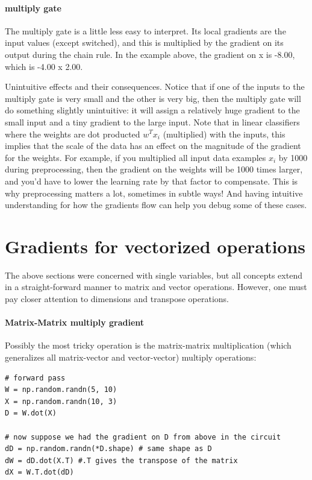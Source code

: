 \paragraph*{multiply gate} The multiply gate is a little less easy to interpret. Its local gradients are the input values (except switched), and this is multiplied by the gradient on its output during the chain rule. In the example above, the gradient on x is -8.00, which is -4.00 x 2.00.

Unintuitive effects and their consequences. Notice that if one of the inputs to the multiply gate is very small and the other is very big, then the multiply gate will do something slightly unintuitive: it will assign a relatively huge gradient to the small input and a tiny gradient to the large input. Note that in linear classifiers where the weights are dot producted $w^Tx_i$ (multiplied) with the inputs, this implies that the scale of the data has an effect on the magnitude of the gradient for the weights. For example, if you multiplied all input data examples $x_i$ by 1000 during preprocessing, then the gradient on the weights will be 1000 times larger, and you’d have to lower the learning rate by that factor to compensate. This is why preprocessing matters a lot, sometimes in subtle ways! And having intuitive understanding for how the gradients flow can help you debug some of these cases.


\section*{Gradients for vectorized operations}

The above sections were concerned with single variables, but all concepts extend in a straight-forward manner to matrix and vector operations. However, one must pay closer attention to dimensions and transpose operations.

\paragraph*{Matrix-Matrix multiply gradient} Possibly the most tricky operation is the matrix-matrix multiplication (which generalizes all matrix-vector and vector-vector) multiply operations:

\begin{lstlisting}[frame=single]
# forward pass
W = np.random.randn(5, 10)
X = np.random.randn(10, 3)
D = W.dot(X)

# now suppose we had the gradient on D from above in the circuit
dD = np.random.randn(*D.shape) # same shape as D
dW = dD.dot(X.T) #.T gives the transpose of the matrix
dX = W.T.dot(dD)
\end{lstlisting}

